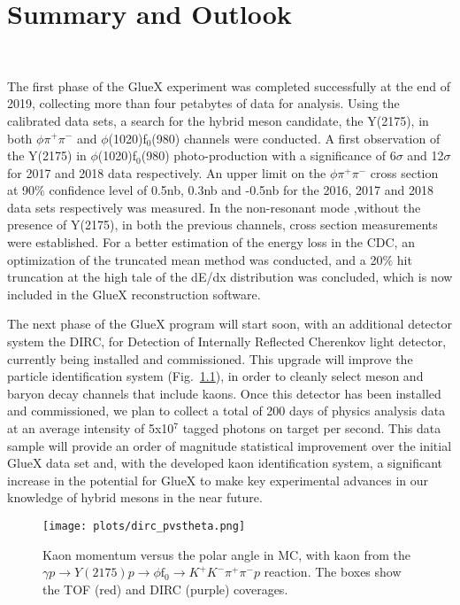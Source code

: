 \chapter{Summary and Outlook}
\label{chap.summ}

~\par The first phase of the GlueX experiment was completed successfully at the end of 2019, collecting more than four petabytes of data for analysis. Using the calibrated data sets, a search for the hybrid meson candidate, the Y(2175), in both $\phi\pi^{+}\pi^{-}$ and $\phi$(1020)f$_0$(980) channels were conducted. A first observation of the Y(2175) in $\phi$(1020)f$_0$(980) photo-production with a significance of 6$\sigma$ and 12$\sigma$ for 2017 and 2018 data respectively. An upper limit on the $\phi\pi^{+}\pi^{-}$ cross section at 90$\%$ confidence level of 0.5nb, 0.3nb and -0.5nb for the 2016, 2017 and 2018 data sets respectively was measured. In the non-resonant mode ,without the presence of Y(2175), in both the previous channels, cross section measurements were established. For a better estimation of the energy loss in the CDC, an optimization of the truncated mean method was conducted, and a 20$\%$ hit truncation at the high tale of the dE/dx distribution was concluded, which is now included in the GlueX reconstruction software.
~\par The next phase of the GlueX program will start soon, with an additional detector system the DIRC, for Detection of Internally Reflected Cherenkov light detector, currently being installed and commissioned. This upgrade will improve the particle identification system (Fig.~\ref{fig.summ}), in order to cleanly select meson and baryon decay channels that include kaons. Once this detector has been installed and commissioned, we plan to collect a total of 200 days of physics analysis data at an average intensity of 5x10$^7$ tagged photons on target per second. This data sample will provide an order of magnitude statistical improvement over the initial GlueX data set and, with the developed kaon identification system, a significant increase in the potential for GlueX to make key experimental advances in our knowledge of hybrid mesons in the near future.

\begin{figure}[H]
    \centering
    \texttt{[image: plots/dirc\_pvstheta.png]}
    \caption{Kaon momentum versus the polar angle in MC, with kaon from the $\gamma p \rightarrow Y(2175) p \rightarrow \phi \mathrm{f}_0  \rightarrow  K^{+} K^{-} \pi^{+} \pi^{-} p$ reaction. The boxes show the TOF (red) and DIRC (purple) coverages.}
    \label{fig.summ}
\end{figure}